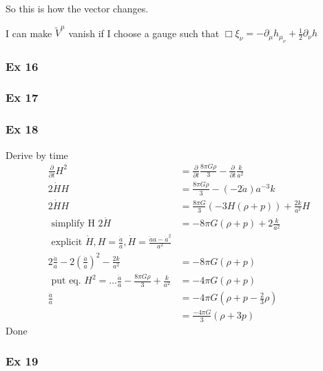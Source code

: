 So this is how the vector changes.\par
I can make $\tilde{V}^{\mu }$ vanish if I choose a gauge such that $\Box \xi _{\nu } = -\partial_{\mu }h_{\mu }_{\nu } + \frac{1}{2}\partial_{\nu }h$

\subsubsection{Ex 16}



\subsubsection{Ex 17}

\subsubsection{Ex 18}
Derive by time
\begin{align*}
	\frac{\partial }{\partial t}  H^{2} &= \frac{\partial }{\partial t}  \frac{8\pi G \rho }{3} - \frac{\partial }{\partial t}  \frac{k}{a^{2}}\\
2 \dot{H}H &= \frac{8\pi G \dot{\rho }}{3} - \left( -2\dot{a} \right)a^{-3}k\\
 2\dot{H}H &= \frac{8\pi G}{3}\left( -3H\left( \rho +p \right) \right) + \frac{2k}{a^{2}}H\\
 \text{ simplify H }
 2\dot{H} &= -8 \pi G \left( \rho +p \right) + 2 \frac{k}{a^{2}}\\
 \text{ explicit } \dot{H}, H = \frac{\dot{a}}{a}, \dot{H} = \frac{\ddot{a}a - \dot{a}^{2}}{a^{2}}\\
 2 \frac{\ddot{a}}{a} - 2 \left( \frac{\dot{a}}{a} \right)^{2} - \frac{2k}{a^{2}} &= -8\pi G\left( \rho +p \right)\\
 \text{ put eq.  } H^{2} = \ldots 
 \frac{\ddot{a}}{a} - \frac{8\pi G\rho }{3}+ \frac{k}{a^{2}} &= -4\pi G\left( \rho +p \right)\\
 \frac{\ddot{a}}{a} &= -4\pi G \left( \rho +p-\frac{2}{3}\rho  \right)\\
		    &= \frac{-4\pi G}{3}\left( \rho +3p \right)
\end{align*}
Done

\subsubsection{Ex 19}

